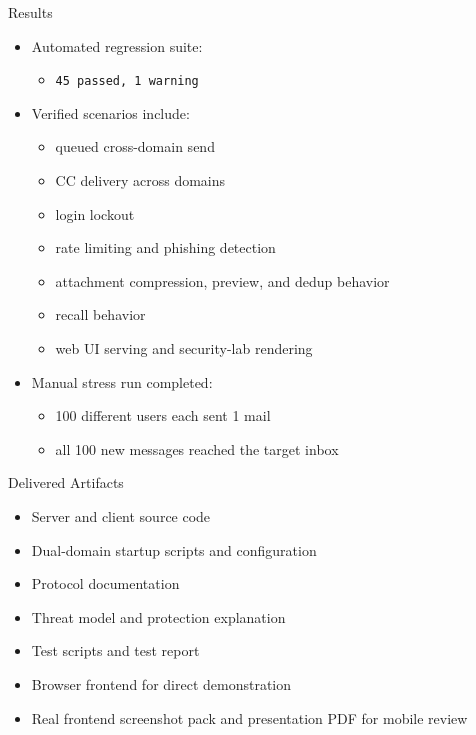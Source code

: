 \documentclass[aspectratio=169]{beamer}
\begin{document}
\begin{frame}{Results}
  \begin{itemize}
    \item Automated regression suite:
    \begin{itemize}
      \item \texttt{45 passed, 1 warning}
    \end{itemize}
    \item Verified scenarios include:
    \begin{itemize}
      \item queued cross-domain send
      \item CC delivery across domains
      \item login lockout
      \item rate limiting and phishing detection
      \item attachment compression, preview, and dedup behavior
      \item recall behavior
      \item web UI serving and security-lab rendering
    \end{itemize}
    \item Manual stress run completed:
    \begin{itemize}
      \item 100 different users each sent 1 mail
      \item all 100 new messages reached the target inbox
    \end{itemize}
  \end{itemize}
\end{frame}

\begin{frame}{Delivered Artifacts}
  \begin{itemize}
    \item Server and client source code
    \item Dual-domain startup scripts and configuration
    \item Protocol documentation
    \item Threat model and protection explanation
    \item Test scripts and test report
    \item Browser frontend for direct demonstration
    \item Real frontend screenshot pack and presentation PDF for mobile review
  \end{itemize}
\end{frame}
\end{document}

